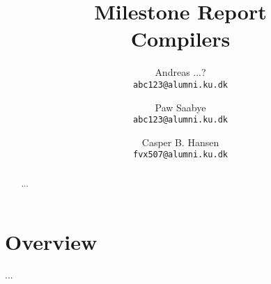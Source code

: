 \documentclass[11pt,a4paper]{article}
\title
{
	{\large Milestone Report}\\
	Compilers
}
\author
{
	Andreas ...?\\
	{\tt abc123@alumni.ku.dk}
	\and
	Paw Saabye\\
	{\tt abc123@alumni.ku.dk}
	\and
	Casper B. Hansen\\
	{\tt fvx507@alumni.ku.dk}
}
\begin{document}
\clearpage
\maketitle
\thispagestyle{empty}
\begin{multicols}{2}
\begin{abstract}
...
\end{abstract}
\vfill
\columnbreak
\tableofcontents
\end{multicols}

\clearpage
\section{Overview}
...
\end{document}
